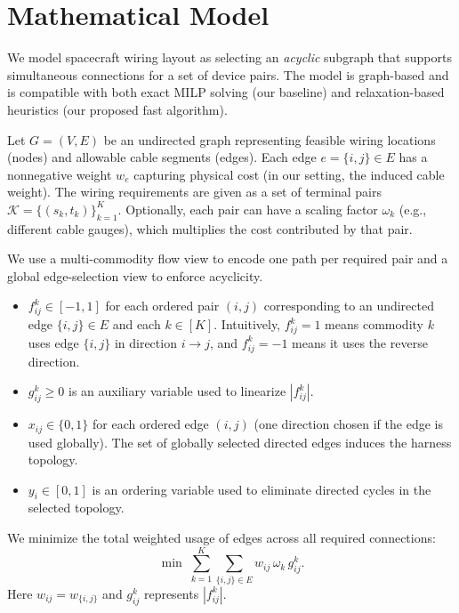 \section{Mathematical Model}
\label{sec:model}

We model spacecraft wiring layout as selecting an \emph{acyclic} subgraph that supports simultaneous connections for a set of device pairs.
The model is graph-based and is compatible with both exact MILP solving (our baseline) and relaxation-based heuristics (our proposed fast algorithm).

Let $G=(V,E)$ be an undirected graph representing feasible wiring locations (nodes) and allowable cable segments (edges).
Each edge $e=\{i,j\}\in E$ has a nonnegative weight $w_e$ capturing physical cost (in our setting, the induced cable weight).
The wiring requirements are given as a set of terminal pairs $\mathcal K = \{(s_k,t_k)\}_{k=1}^K$.
Optionally, each pair can have a scaling factor $\omega_k$ (e.g., different cable gauges), which multiplies the cost contributed by that pair.

We use a multi-commodity flow view to encode one path per required pair and a global edge-selection view to enforce acyclicity.

\begin{itemize}
  \item $f_{ij}^k \in [-1,1]$ for each ordered pair $(i,j)$ corresponding to an undirected edge $\{i,j\}\in E$ and each $k\in[K]$.
  Intuitively, $f_{ij}^k=1$ means commodity $k$ uses edge $\{i,j\}$ in direction $i\to j$, and $f_{ij}^k=-1$ means it uses the reverse direction.
  \item $g_{ij}^k\ge 0$ is an auxiliary variable used to linearize $|f_{ij}^k|$.
  \item $x_{ij}\in\{0,1\}$ for each ordered edge $(i,j)$ (one direction chosen if the edge is used globally).
  The set of globally selected directed edges induces the harness topology.
  \item $y_i\in[0,1]$ is an ordering variable used to eliminate directed cycles in the selected topology.
\end{itemize}

We minimize the total weighted usage of edges across all required connections:
\begin{equation}
\label{eq:obj}
\min \; \sum_{k=1}^K \sum_{\{i,j\}\in E} w_{ij}\,\omega_k\, g_{ij}^k.
\end{equation}
Here $w_{ij}=w_{\{i,j\}}$ and $g_{ij}^k$ represents $|f_{ij}^k|$.

